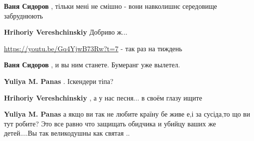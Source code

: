 \begin{itemize}
\begin{itemize}
\begin{itemize}
\textbf{Ваня Сидоров} , тільки мені не смішно - вони навколишнє середовище забруднюють

 
\textbf{Hrihoriy Vereshchinskiy} Добриво ж...

 
\url{https://youtu.be/Gq4YjwB73Rw?t=7} - так раз на тиждень

 
\textbf{Ваня Сидоров} , и вы ним станете. Бумеранг уже вылетел.

 
\textbf{Yuliya M. Panas} . Іскендери тіпа?

\end{itemize}


 
\textbf{Hrihoriy Vereshchinskiy} , а у нас песня... в своём глазу ищите

\begin{itemize}
 
\textbf{Yuliya M. Panas} а якщо ви так не любите країну бе живе е,і за сусіда,то що ви тут робите?
Это все равно что защищать обидчика и убийцу ваших же детей....Вы так великодушны как святая ..
\end{itemize}


\end{itemize}
\end{itemize}
